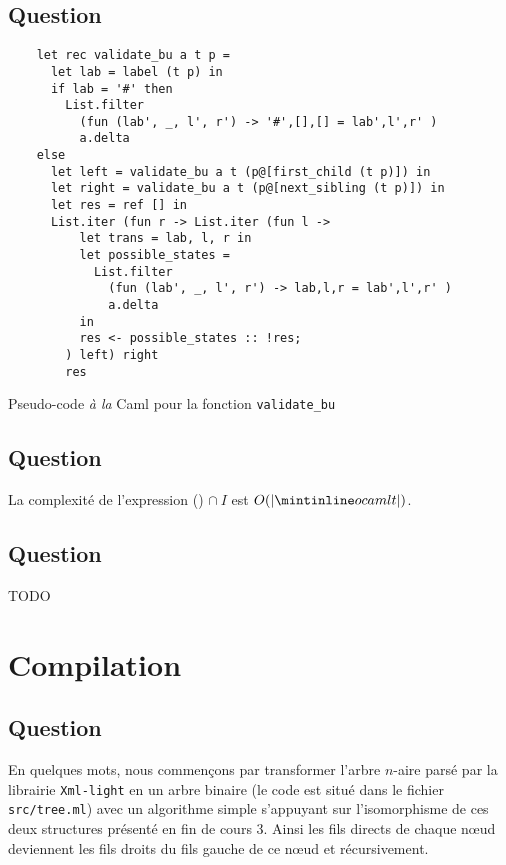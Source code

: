 \documentclass[twoside,12pt]{article}
\begin{document}
\subsection{Question}
\begin{algorithm}
    \bigskip
  \begin{verbatim}
    let rec validate_bu a t p =
      let lab = label (t p) in
      if lab = '#' then
        List.filter
          (fun (lab', _, l', r') -> '#',[],[] = lab',l',r' )
          a.delta
    else
      let left = validate_bu a t (p@[first_child (t p)]) in
      let right = validate_bu a t (p@[next_sibling (t p)]) in
      let res = ref [] in
      List.iter (fun r -> List.iter (fun l ->
          let trans = lab, l, r in
          let possible_states =
            List.filter
              (fun (lab', _, l', r') -> lab,l,r = lab',l',r' )
              a.delta
          in
          res <- possible_states :: !res;
        ) left) right
        res
   \end{verbatim}
   \caption{\small Pseudo-code \textit{à la} Caml pour la fonction \texttt{validate\_bu}}
\end{algorithm}


\subsection{Question}

La complexité de l'expression () $\cap\ I$ est $O(|\ocaml{t}|)$.

\subsection{Question} TODO


\section{Compilation}
\subsection{Question}
En quelques mots, nous commençons par transformer l'arbre $n$-aire parsé
par la librairie \texttt{Xml-light} en un arbre binaire (le code est situé
dans le fichier \texttt{src/tree.ml}) avec un algorithme simple s'appuyant
sur l'isomorphisme de ces deux structures présenté en fin de cours 3. Ainsi
les fils directs de chaque n\oe{}ud deviennent les fils droits du fils gauche
de ce n\oe{}ud et récursivement.
\end{document}
